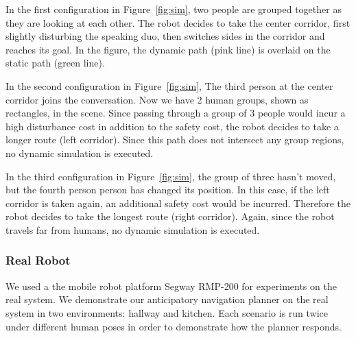 In the first configuration in Figure~\ref{fig:sim}, two people are grouped together as they are looking at each other. The robot decides to take the center corridor, first slightly disturbing the speaking duo, then switches sides in the corridor and reaches its goal. In the figure, the dynamic path (pink line) is overlaid on the static path (green line). 

In the second configuration in Figure~\ref{fig:sim}, The third person at the center corridor joins the conversation. Now we have 2 human groups, shown as rectangles, in the scene. Since passing through a group of 3 people would incur a high disturbance cost in addition to the safety cost, the robot decides to take a longer route (left corridor). Since this path does not intersect any group regions, no dynamic simulation is executed.

In the third configuration in Figure~\ref{fig:sim}, the group of three hasn't moved, but the fourth person person has changed its position. In this case, if the left corridor is taken again, an additional safety cost would be incurred. Therefore the robot decides to take the longest route (right corridor). Again, since the robot travels far from humans, no dynamic simulation is executed.

\subsubsection{Real Robot}
\label{sec:navigation_results_real_robot}

We used a the mobile robot platform Segway RMP-200 for experiments on the real system. We demonstrate our anticipatory navigation planner on the real system in two environments: hallway and kitchen. Each scenario is run twice under different human poses in order to demonstrate how the planner responds.




